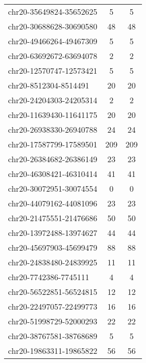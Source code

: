 \begin{longtable}{lSS}
	chr20-35649824-35652625 & 5    & 5                               \\
	chr20-30688628-30690580 & 48   & 48                              \\
	chr20-49466264-49467309 & 5    & 5                               \\
	chr20-63692672-63694078 & 2    & 2                               \\
	chr20-12570747-12573421 & 5    & 5                               \\
	chr20-8512304-8514491   & 20   & 20                              \\
	chr20-24204303-24205314 & 2    & 2                               \\
	chr20-11639430-11641175 & 20   & 20                              \\
	chr20-26938330-26940788 & 24   & 24                              \\
	chr20-17587799-17589501 & 209  & 209                             \\
	chr20-26384682-26386149 & 23   & 23                              \\
	chr20-46308421-46310414 & 41   & 41                              \\
	chr20-30072951-30074554 & 0    & 0                               \\
	chr20-44079162-44081096 & 23   & 23                              \\
	chr20-21475551-21476686 & 50   & 50                              \\
	chr20-13972488-13974627 & 44   & 44                              \\
	chr20-45697903-45699479 & 88   & 88                              \\
	chr20-24838480-24839925 & 11   & 11                              \\
	chr20-7742386-7745111   & 4    & 4                               \\
	chr20-56522851-56524815 & 12   & 12                              \\
	chr20-22497057-22499773 & 16   & 16                              \\
	chr20-51998729-52000293 & 22   & 22                              \\
	chr20-38767581-38768689 & 5    & 5                               \\
	chr20-19863311-19865822 & 56   & 56                              \\

\end{longtable}
